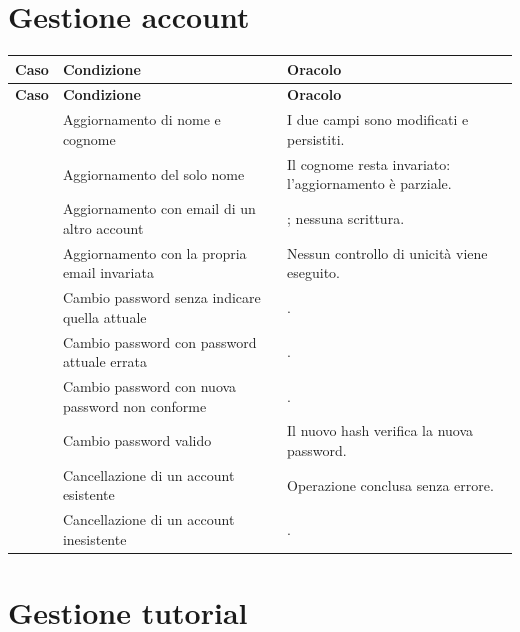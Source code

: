 \section{Gestione account}

\begin{longtable}{@{}l L{5.0cm} L{7.4cm}@{}}
\toprule
\textbf{Caso} & \textbf{Condizione} & \textbf{Oracolo} \\
\midrule
\endfirsthead
\toprule
\textbf{Caso} & \textbf{Condizione} & \textbf{Oracolo} \\
\midrule
\endhead
\bottomrule
\endlastfoot

 & Aggiornamento di nome e cognome &
I due campi sono modificati e persistiti. \\

 & Aggiornamento del solo nome &
Il cognome resta invariato: l'aggiornamento è parziale. \\

 & Aggiornamento con email di un altro account &
; nessuna scrittura. \\

 & Aggiornamento con la propria email invariata &
Nessun controllo di unicità viene eseguito. \\

 & Cambio password senza indicare quella attuale &
. \\

 & Cambio password con password attuale errata &
. \\

 & Cambio password con nuova password non conforme &
. \\

 & Cambio password valido &
Il nuovo hash verifica la nuova password. \\

 & Cancellazione di un account esistente &
Operazione conclusa senza errore. \\

 & Cancellazione di un account inesistente &
. \\

\end{longtable}

\section{Gestione tutorial}

